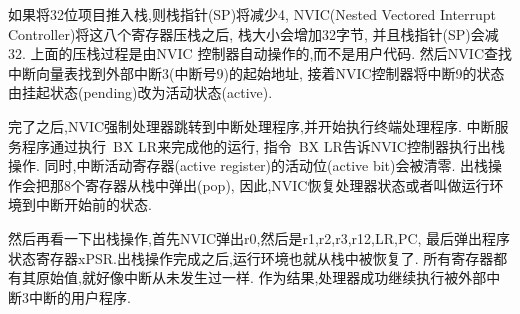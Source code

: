 如果将32位项目推入栈,则栈指针(SP)将减少4,
NVIC(Nested Vectored Interrupt Controller)将这八个寄存器压栈之后,
栈大小会增加32字节,
并且栈指针(SP)会减32.
上面的压栈过程是由NVIC 控制器自动操作的,而不是用户代码.
然后NVIC查找中断向量表找到外部中断3(中断号9)的起始地址,
接着NVIC控制器将中断9的状态由挂起状态(pending)改为活动状态(active).

完了之后,NVIC强制处理器跳转到中断处理程序,并开始执行终端处理程序.
中断服务程序通过执行~BX LR来完成他的运行,
指令~BX LR告诉NVIC控制器执行出栈操作.
同时,中断活动寄存器(active register)的活动位(active bit)会被清零.
出栈操作会把那8个寄存器从栈中弹出(pop),
因此,NVIC恢复处理器状态或者叫做运行环境到中断开始前的状态.

然后再看一下出栈操作,首先NVIC弹出r0,然后是r1,r2,r3,r12,LR,PC,
最后弹出程序状态寄存器xPSR.出栈操作完成之后,运行环境也就从栈中被恢复了.
所有寄存器都有其原始值,就好像中断从未发生过一样.
作为结果,处理器成功继续执行被外部中断3中断的用户程序.


